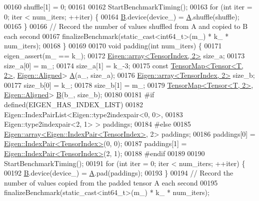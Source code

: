 \begin{DoxyCode}
00160     shuffle[1] = 0;
00161 
00162     StartBenchmarkTiming();
00163     \textcolor{keywordflow}{for} (\textcolor{keywordtype}{int} iter = 0; iter < num\_iters; ++iter) \{
00164       \hyperlink{group___core___module_class_eigen_1_1_matrix}{B}.device(device\_) = \hyperlink{group___core___module_class_eigen_1_1_matrix}{A}.shuffle(shuffle);
00165     \}
00166     \textcolor{comment}{// Record the number of values shuffled from A and copied to B each second}
00167     finalizeBenchmark(static\_cast<int64\_t>(m\_) * k\_ * num\_iters);
00168   \}
00169 
00170  \textcolor{keywordtype}{void} padding(\textcolor{keywordtype}{int} num\_iters) \{
00171     eigen\_assert(m\_ == k\_);
00172     \hyperlink{class_eigen_1_1array}{Eigen::array<TensorIndex, 2>} size\_a;
00173     size\_a[0] = m\_;
00174     size\_a[1] = k\_-3;
00175     \textcolor{keyword}{const} \hyperlink{class_eigen_1_1_tensor_map}{TensorMap<Tensor<T, 2>}, \hyperlink{group__enums_gga45fe06e29902b7a2773de05ba27b47a1ad37d4c71425bb286e9b4103830538fbf}{Eigen::Aligned}> 
      \hyperlink{group___core___module_class_eigen_1_1_matrix}{A}(a\_, size\_a);
00176     \hyperlink{class_eigen_1_1array}{Eigen::array<TensorIndex, 2>} size\_b;
00177     size\_b[0] = k\_;
00178     size\_b[1] = m\_;
00179     \hyperlink{class_eigen_1_1_tensor_map}{TensorMap<Tensor<T, 2>}, \hyperlink{group__enums_gga45fe06e29902b7a2773de05ba27b47a1ad37d4c71425bb286e9b4103830538fbf}{Eigen::Aligned}> 
      \hyperlink{group___core___module_class_eigen_1_1_matrix}{B}(b\_, size\_b);
00180 
00181 \textcolor{preprocessor}{#if defined(EIGEN\_HAS\_INDEX\_LIST)}
00182     Eigen::IndexPairList<Eigen::type2indexpair<0, 0>,
00183                          Eigen::type2indexpair<2, 1> > paddings;
00184 \textcolor{preprocessor}{#else}
00185     \hyperlink{class_eigen_1_1array}{Eigen::array<Eigen::IndexPair<TensorIndex>}, 2> paddings;
00186     paddings[0] = \hyperlink{struct_eigen_1_1_index_pair}{Eigen::IndexPair<TensorIndex>}(0, 0);
00187     paddings[1] = \hyperlink{struct_eigen_1_1_index_pair}{Eigen::IndexPair<TensorIndex>}(2, 1);
00188 \textcolor{preprocessor}{#endif}
00189 
00190     StartBenchmarkTiming();
00191     \textcolor{keywordflow}{for} (\textcolor{keywordtype}{int} iter = 0; iter < num\_iters; ++iter) \{
00192       \hyperlink{group___core___module_class_eigen_1_1_matrix}{B}.device(device\_) = \hyperlink{group___core___module_class_eigen_1_1_matrix}{A}.pad(paddings);
00193     \}
00194     \textcolor{comment}{// Record the number of values copied from the padded tensor A each second}
00195     finalizeBenchmark(static\_cast<int64\_t>(m\_) * k\_ * num\_iters);

\end{DoxyCode}
